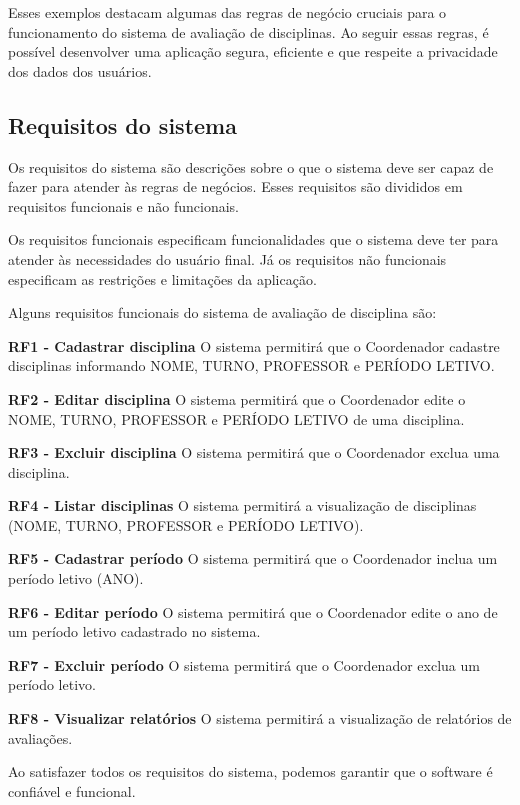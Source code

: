 Esses exemplos destacam algumas das regras de negócio cruciais para o funcionamento do sistema de avaliação de disciplinas. Ao seguir essas regras, é possível desenvolver uma aplicação segura, eficiente e que respeite a privacidade dos dados dos usuários.

\subsection{Requisitos do sistema}
Os requisitos do sistema são descrições sobre o que o sistema deve ser capaz de fazer para atender às regras de negócios. Esses requisitos são divididos em requisitos funcionais e não funcionais. 

Os requisitos funcionais especificam funcionalidades que o sistema deve ter para atender às necessidades do usuário final. Já os requisitos não funcionais especificam as restrições e limitações da aplicação.

Alguns requisitos funcionais do sistema de avaliação de disciplina são:

\begin{alineas}
    \item \textbf{RF1 - Cadastrar disciplina} O sistema permitirá que o Coordenador cadastre disciplinas informando NOME, TURNO, PROFESSOR e PERÍODO LETIVO.
    \item \textbf{RF2 - Editar disciplina} O sistema permitirá que o Coordenador edite o NOME, TURNO, PROFESSOR e PERÍODO LETIVO de uma disciplina.
    \item \textbf{RF3 - Excluir disciplina} O sistema permitirá que o Coordenador exclua uma disciplina.
    \item \textbf{RF4 - Listar disciplinas} O sistema permitirá a visualização de disciplinas (NOME, TURNO, PROFESSOR e PERÍODO LETIVO).
    \item \textbf{RF5 - Cadastrar período} O sistema permitirá que o Coordenador inclua um período letivo (ANO).
    \item \textbf{RF6 - Editar período} O sistema permitirá que o Coordenador edite o ano de um período letivo cadastrado no sistema.
    \item \textbf{RF7 - Excluir período} O sistema permitirá que o Coordenador exclua um período letivo.
    \item \textbf{RF8 - Visualizar relatórios} O sistema permitirá a visualização de relatórios de avaliações.
\end{alineas}

Ao satisfazer todos os requisitos do sistema, podemos garantir que o software é confiável e funcional. 

